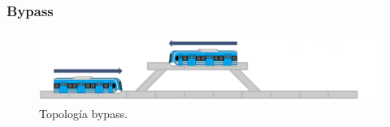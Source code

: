 \subsubsection{Bypass}

\lipsum[1]

    \begin{figure}[h]
        \centering
        \includegraphics[width=1\textwidth]{Figuras/bypass}
        \centering\caption{Topología bypass.}
        \label{fig:bypass_1}
    \end{figure}
    
\lipsum[1]